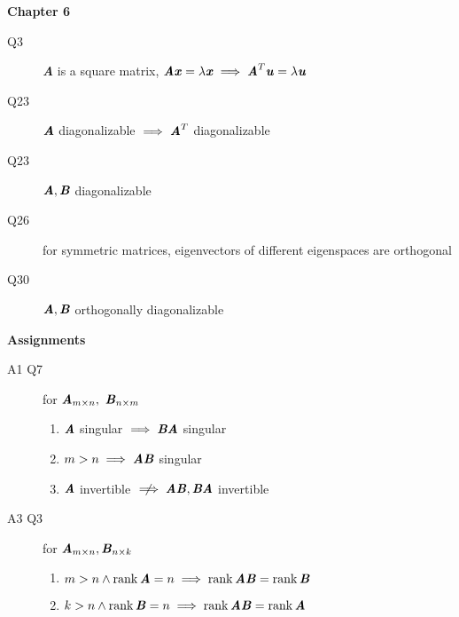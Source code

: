 \documentclass[landscape, a4paper]{article}
\newcommand{\V}[1]{\textbf{\textit{#1}}}
\newcommand{\rank}{\operatorname{rank}}
\renewcommand{\and}{\wedge}
\newcommand{\heading}[1]{
    \noindent\textbf{#1}
}
\begin{document}
\begin{multicols*}{4}
\begin{description}
\begin{description}
            \end{description}
    \end{description}
    \heading{Chapter 6}
    \begin{description}
        \item[Q3] \V{A} is a square matrix, $\V{Ax}=\lambda\V{x}\implies \V{A}^T\V{u}=\lambda\V{u}$
        \item[Q23] $\V{A}$ diagonalizable $\implies \V{A}^T$ diagonalizable
        \item[Q23] $\V{A}, \V{B}$ diagonalizable
        \item[Q26] for symmetric matrices, eigenvectors of different eigenspaces are orthogonal
        \item[Q30] $\V{A}, \V{B}$ orthogonally diagonalizable
    \end{description}
    \heading{Assignments}
    \begin{description}
        \item[A1 Q7] for $\V{A}_{m\times n},\ \V{B}_{n\times m}$
            \begin{enumerate}[wide]
                \item $\V{A}$ singular $\implies \V{BA}$ singular
                \item $m>n\implies \V{AB}$ singular
                \item $\V{A}$ invertible $\centernot\implies \V{AB}, \V{BA}$ invertible
            \end{enumerate}
        \item[A3 Q3] for $\V{A}_{m\times n}, \V{B}_{n\times k}$
            \begin{enumerate}[wide]
                \item $m>n \and \rank\V{A}=n\implies \rank\V{AB}=\rank\V{B}$
                \item $k>n\and \rank\V{B}=n\implies \rank\V{AB}=\rank\V{A}$

\end{enumerate}
\end{description}
\end{multicols*}
\end{document}
